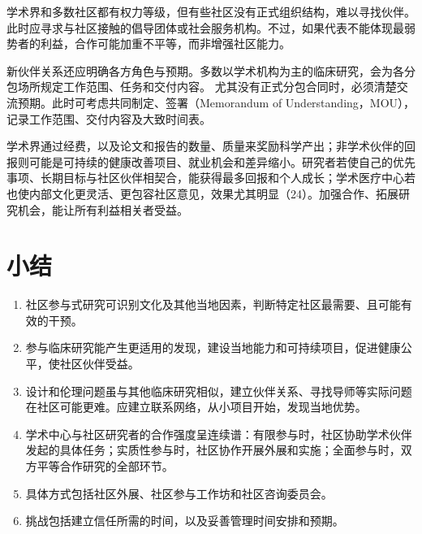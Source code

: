 学术界和多数社区都有权力等级，但有些社区没有正式组织结构，难以寻找伙伴。此时应寻求与社区接触的倡导团体或社会服务机构。不过，如果代表不能体现最弱势者的利益，合作可能加重不平等，而非增强社区能力。

新伙伴关系还应明确各方角色与预期。多数以学术机构为主的临床研究，会为各分包场所规定工作范围、任务和交付内容。
尤其没有正式分包合同时，必须清楚交流预期。此时可考虑共同制定、签署（Memorandum of Understanding，MOU），记录工作范围、交付内容及大致时间表。

学术界通过经费，以及论文和报告的数量、质量来奖励科学产出；非学术伙伴的回报则可能是可持续的健康改善项目、就业机会和差异缩小。研究者若使自己的优先事项、长期目标与社区伙伴相契合，能获得最多回报和个人成长；学术医疗中心若也使内部文化更灵活、更包容社区意见，效果尤其明显（24）。加强合作、拓展研究机会，能让所有利益相关者受益。

\section{小结}
\begin{enumerate}
\item 社区参与式研究可识别文化及其他当地因素，判断特定社区最需要、且可能有效的干预。
\item 参与临床研究能产生更适用的发现，建设当地能力和可持续项目，促进健康公平，使社区伙伴受益。
\item 设计和伦理问题虽与其他临床研究相似，建立伙伴关系、寻找导师等实际问题在社区可能更难。应建立联系网络，从小项目开始，发现当地优势。
\item 学术中心与社区研究者的合作强度呈连续谱：有限参与时，社区协助学术伙伴发起的具体任务；实质性参与时，社区协作开展外展和实施；全面参与时，双方平等合作研究的全部环节。
\item 具体方式包括社区外展、社区参与工作坊和社区咨询委员会。
\item 挑战包括建立信任所需的时间，以及妥善管理时间安排和预期。
\end{enumerate}

